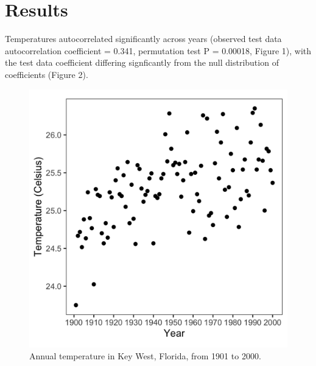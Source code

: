 \documentclass{article}
\begin{document}
\section{Results \vspace{-0.5em}}

Temperatures autocorrelated significantly across years (observed test data autocorrelation coefficient = 0.341, 
permutation test P = 0.00018, Figure 1), with the test data coefficient differing signficantly from the null 
distribution of coefficients (Figure 2). \vspace{-0.5em}

    \begin{figure}[htbp]
    \centering
    \begin{minipage}{.5\textwidth}
        \centering
        \includegraphics[scale=0.8]{../results/DistributionFlorida.png}
        \caption{Annual temperature in Key West, Florida, \newline from 1901 to 2000.} 
        \label{fig.test1}
    \end{minipage}%
    \begin{minipage}{.5\textwidth}
        \centering

\end{minipage}
\end{figure}
\end{document}

